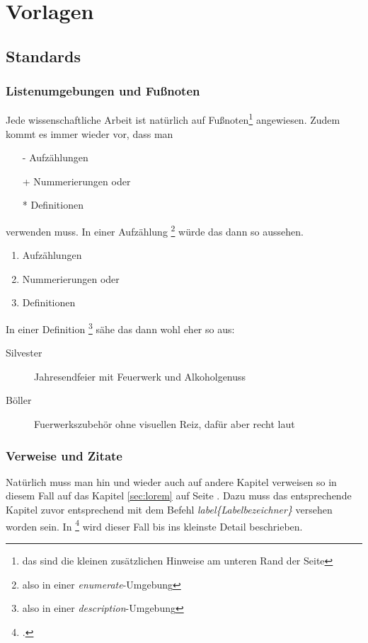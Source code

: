 \chapter{Vorlagen}
\label{cha:Vorlagen}

\section{Standards}
\subsection{Listenumgebungen und Fußnoten}
Jede wissenschaftliche Arbeit ist natürlich auf Fußnoten\footnote{das sind die kleinen zusätzlichen Hinweise am unteren Rand der Seite} angewiesen. Zudem kommt es immer wieder vor, dass man 
\begin{itemize}
\item[-] Aufzählungen
\item[+] Nummerierungen oder
\item[*] Definitionen 
\end{itemize}
verwenden muss. In einer Aufzählung \footnote{also in einer \textit{enumerate}-Umgebung} würde das dann so aussehen.
\begin{enumerate}
\item Aufzählungen
\item Nummerierungen oder
\item Definitionen 
\end{enumerate}

In einer Definition \footnote{also in einer \textit{description}-Umgebung} sähe das dann wohl eher so aus:

\begin{description}
\item[Silvester]Jahresendfeier mit Feuerwerk und Alkoholgenuss
\item[Böller] Fuerwerkszubehör ohne visuellen Reiz, dafür aber recht laut
\end{description}
\subsection{Verweise und Zitate}
Natürlich muss man hin und wieder auch auf andere Kapitel verweisen so \zB in diesem Fall auf das Kapitel \ref{sec:lorem} auf Seite \pageref{sec:lorem}. Dazu muss das entsprechende Kapitel zuvor entsprechend mit dem Befehl \textit{\bs label\{Labelbezeichner\}} versehen worden sein. In \footcite{bydesign_book} wird dieser Fall bis ins kleinste Detail beschrieben.

